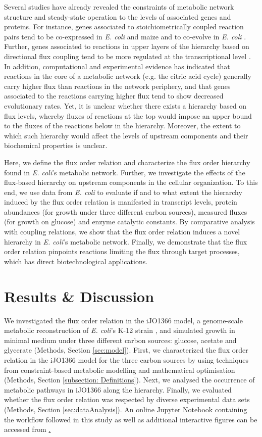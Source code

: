 \documentclass[12pt]{article}
\begin{document}
Several studies have already revealed the constraints of metabolic network structure and steady-state operation to the levels of associated genes and proteins.  For instance, genes associated to stoichiometrically coupled reaction pairs tend to be co-expressed in \emph{E. coli}\cite{Notebaart2008} and maize \cite{Robaina-Estevez2016} and to co-evolve in \emph{E. coli} \cite{Pal2005}. Further, genes associated to reactions in upper layers of the hierarchy based on directional flux coupling tend to be more regulated at the transcriptional level \cite{Hosseini2015}. In addition, computational and experimental evidence has indicated that reactions in the core of a metabolic network (e.g. the citric acid cycle) generally carry higher flux than reactions in the network periphery, and that genes associated to the reactions carrying higher flux tend to show decreased evolutionary rates\cite{Vitkup2006a}. Yet, it is unclear whether there exists a hierarchy based on flux levels, whereby fluxes of reactions at the top would impose an upper bound to the fluxes of the reactions below in the hierarchy. Moreover, the extent to which such hierarchy would affect the levels of upstream components and their biochemical properties is unclear.

Here, we define the flux order relation and characterize the flux order hierarchy found in \emph{E. coli}'s metabolic network. Further, we investigate the effects of the flux-based hierarchy on upstream components in the cellular organization. To this end, we use data from \emph{E. coli} to evaluate if and to what extent the hierarchy induced by the flux order relation is manifested in transcript levels, protein abundances (for growth under three different carbon sources), measured fluxes (for growth on glucose) and enzyme catalytic constants. By comparative analysis with coupling relations, we show that the flux order relation induces a novel hierarchy in \emph{E. coli}'s metabolic network.  Finally, we demonstrate that the flux order relation pinpoints reactions limiting the flux through target processes, which has direct biotechnological applications.

\section{Results \& Discussion}
We investigated the flux order relation in the iJO1366 model, a genome-scale metabolic reconstruction of \emph{E. coli}'s K-12 strain \cite{Orth2014}, and simulated growth in minimal medium under three different carbon sources: glucose, acetate and glycerate (Methods, Section \ref{sec:model}). First, we characterized the flux order relation in the iJO1366 model for the three carbon sources by using techniques from constraint-based metabolic modelling and mathematical optimisation (Methods, Section \ref{subsection: Definitions}). Next, we analysed the occurrence of metabolic pathways in iJO1366 along the hierarchy. Finally, we evaluated whether the flux order relation was respected by diverse experimental data sets (Methods, Section \ref{sec:dataAnalysis}). An online Jupyter Notebook containing the workflow followed in this study as well as additional interactive figures can be accessed from \href{https://robaina.github.io/fluxOrders}.
\end{document}
